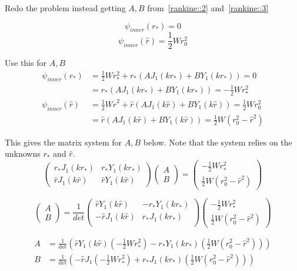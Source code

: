 \documentclass{X:/Documents/Coding/Latex/myreport}
\begin{document}
Redo the problem instead getting $A,B$ from~\ref{rankine::2} and~\ref{rankine::3}

\[\psi_{inner}(r_*) = 0\]
\[\psi_{inner}(\hat{r}) = \frac12 W r_0^2\]




Use this for $A,B$
\begin{align*}
    \psi_{inner}(r_*) &= \frac12 Wr_*^2 +r_*(AJ_1(kr_*) + BY_1(kr_*)) =0\\
    &=r_*(AJ_1(kr_*) + BY_1(kr_*)) =-\frac12 Wr_*^2\\
    \psi_{inner}(\hat{r}) &= \frac12 W\hat{r}^2  +\hat{r}(AJ_1(k\hat{r}) + BY_1(k\hat{r})) =\frac12 W r_0^2\\
    &=\hat{r}(AJ_1(k\hat{r}) + BY_1(k\hat{r})) =\frac12 W (r_0^2 - \hat{r}^2)
\end{align*}

This gives the matrix system for $A,B$ below. Note that the system relies on the unknowns $r_*$ and $\hat{r}$.
\[\begin{pmatrix}
    r_*J_1(kr_*) & r_*Y_1(kr_*)\\
    \hat{r} J_1(k\hat{r}) & \hat{r} Y_1(k\hat{r})
\end{pmatrix}
\begin{pmatrix}
    A\\B
\end{pmatrix} = \begin{pmatrix}
    - \frac12 Wr_*^2\\
    \frac12 W (r_0^2 - \hat{r}^2)
\end{pmatrix}\]


\[
\begin{pmatrix}
    A\\B
\end{pmatrix} = \frac{1}{det}\begin{pmatrix}
     \hat{r} Y_1(k\hat{r})& -r_*Y_1(kr_*)\\
    -\hat{r} J_1(k\hat{r}) & r_*J_1(kr_*)\\
\end{pmatrix}\begin{pmatrix}
    - \frac12 Wr_*^2\\
    \frac12 W (r_0^2 - \hat{r}^2)
\end{pmatrix}\]

\begin{align*}
    A &= \frac{1}{\det} \left(\hat{r} Y_1(k\hat{r})\left(-\frac12 Wr_*^2\right) - r_*Y_1(kr_*) \left(\frac12 W(r_0^2 - \hat{r}^2)\right)\right)\\
    B &= \frac{1}{\det} \left(-\hat{r}J_1\left(-\frac12 Wr_*^2\right) + r_*J_1(kr_*) \left(\frac12 W(r_0^2 - \hat{r}^2)\right)\right)
\end{align*}
\end{document}

